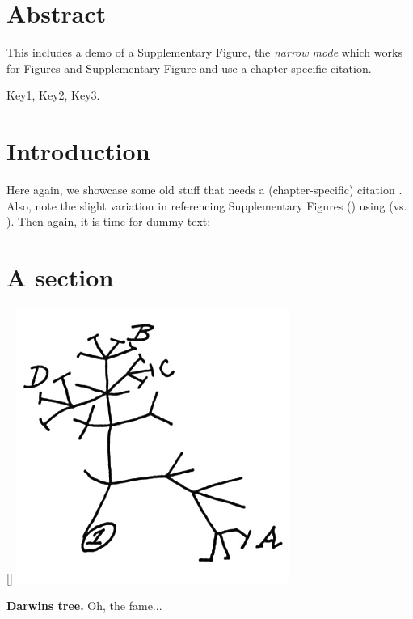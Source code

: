 \section*{Abstract}
This includes a demo of a Supplementary Figure, the \textit{narrow mode} which works for Figures and Supplementary Figure and use a chapter-specific citation.

 Key1, Key2, Key3.

\begin{multicols}{2}
\section{Introduction}
\noindent
Here again, we showcase some old stuff that needs a (chapter-specific) citation .
Also, note the slight variation in referencing Supplementary Figures () using  (vs. ).
Then again, it is time for dummy text: 

\section{A section}
\begin{supplFigure*}[!t]
[\FBwidth]
{\includegraphics[width = .5\fwidth]{figures/c1/tree.jpg}}
{\caption[Darwins tree]{\label{fig:c1s1}\textbf{Darwins tree.}
Oh, the fame...}}
\end{supplFigure*}


\lipsum[2-6] 

\end{multicols}